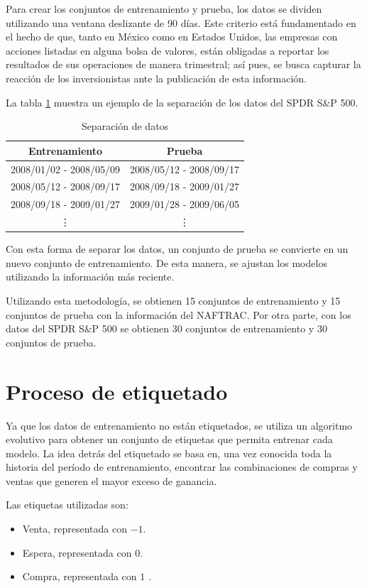 \documentclass[12pt]{report}
\theoremstyle{break}
\theoremstyle{break}
\begin{document}
Para crear los conjuntos de entrenamiento y prueba, los datos se dividen utilizando una ventana deslizante de 90 días. Este criterio está fundamentado en el hecho de que, tanto en México como en Estados Unidos, las empresas con acciones listadas en alguna bolsa de valores, están obligadas a reportar los resultados de sus operaciones de manera trimestral; así pues, se busca capturar la reacción de los inversionistas ante la publicación de esta información.

La tabla \ref{tabla:data split SP500} muestra un ejemplo de la separación de los datos del SPDR S\&P 500.
\begin{table}[h]
\centering
\begin{tabular}{cc}
\hline
\textbf{Entrenamiento} & \textbf{Prueba} \\
\hline
2008/01/02 - 2008/05/09 & 2008/05/12 - 2008/09/17 \\
2008/05/12 - 2008/09/17 & 2008/09/18 - 2009/01/27 \\
2008/09/18 - 2009/01/27 & 2009/01/28 - 2009/06/05 \\
\vdots & \vdots \\
\hline
\end{tabular}
\caption{\label{tabla:data split SP500} Separación de datos}
\end{table}

Con esta forma de separar los datos, un conjunto de prueba se convierte en un nuevo conjunto de entrenamiento. De esta manera, se ajustan los modelos utilizando la información más reciente.

Utilizando esta metodología, se obtienen 15 conjuntos de entrenamiento y 15 conjuntos de prueba con la información del NAFTRAC. Por otra parte, con los datos del SPDR S\&P 500 se obtienen 30 conjuntos de entrenamiento y 30 conjuntos de prueba.

\section{Proceso de etiquetado}
\label{seccion:proceso etiquetado}
Ya que los datos de entrenamiento no están etiquetados, se utiliza un algoritmo evolutivo para obtener un conjunto de etiquetas que permita entrenar cada modelo. La idea detrás del etiquetado se basa en, una vez conocida toda la historia del período de entrenamiento, encontrar las combinaciones de compras y ventas que generen el mayor exceso de ganancia.

Las etiquetas utilizadas son:
\begin{itemize}
\item Venta, representada con $-1$.

\item Espera, representada con $0$.

\item Compra, representada con $1$ .
\end{itemize}
\end{document}
